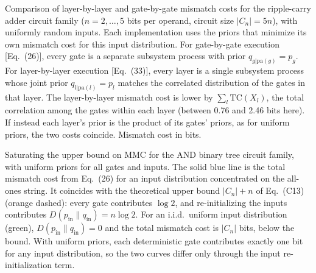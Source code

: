 
\caption{Comparison of layer-by-layer and gate-by-gate mismatch costs for the
ripple-carry adder circuit family ($n = 2,\dots,5$ bits per operand, circuit size
$|C_n| = 5n$), with uniformly random inputs. Each implementation uses the priors that
minimize its own mismatch cost for this input distribution. For gate-by-gate execution
[Eq.~(26)], every gate is a separate subsystem process with prior
$q_{g|\mathrm{pa}(g)} = p_g$. For layer-by-layer execution [Eq.~(33)], every layer is a
single subsystem process whose joint prior $q_{l|\mathrm{pa}(l)} = p_l$ matches the
correlated distribution of the gates in that layer. The layer-by-layer mismatch cost is
lower by $\sum_l \mathrm{TC}(X_l)$, the total correlation among the gates within each
layer (between 0.76 and 2.46 bits here). If instead each layer's prior is the product
of its gates' priors, as for uniform priors, the two costs coincide.
Mismatch cost in bits.}

\caption{Saturating the upper bound on MMC for the AND binary tree circuit family, with
uniform priors for all gates and inputs. The solid blue line is the total mismatch
cost from Eq.~(26) for an input distribution concentrated on the all-ones string. It
coincides with the theoretical upper bound $|C_n| + n$ of Eq.~(C13) (orange dashed):
every gate contributes $\log 2$, and re-initializing the inputs contributes
$D(p_{\mathrm{in}}\|q_{\mathrm{in}}) = n \log 2$. For an i.i.d.\ uniform input
distribution (green), $D(p_{\mathrm{in}}\|q_{\mathrm{in}}) = 0$ and the total mismatch
cost is $|C_n|$ bits, below the bound. With uniform priors, each deterministic gate
contributes exactly one bit for any input distribution, so the two curves differ only
through the input re-initialization term.}

